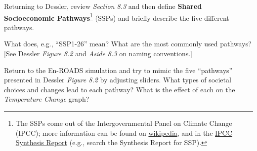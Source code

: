 \newpage

\noindent Returning to Dessler, review {\em Section 8.3} and then define {\bf Shared Socioeconomic Pathways}\footnote{The SSPs come out of the Intergovernmental Panel on Climate Change (IPCC); more information can be found on \href{https://en.wikipedia.org/wiki/Shared_Socioeconomic_Pathways}{wikipedia}, and in the \href{https://www.ipcc.ch/report/ar6/syr/}{IPCC Synthesis Report} (e.g., search the Synthesis Report for SSP).} (SSPs) and briefly describe the five different pathways.

\answerspace[5cm]

\noindent What does, e.g., ``SSP1-26'' mean? What are the most commonly used pathways? [See Dessler {\em Figure 8.2} and {\em Aside 8.3} on naming conventions.]

\answerspace[5cm]

\noindent Return to the En-ROADS simulation and try to mimic the five ``pathways'' presented in Dessler {\em Figure 8.2} by adjusting sliders.  What types of societal choices and changes lead to each pathway?  What is the effect of each on the {\em Temperature Change} graph?



 